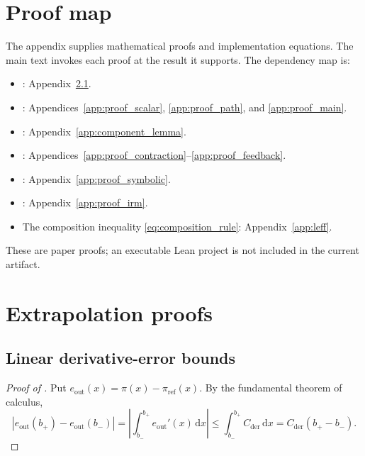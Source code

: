 \appendix

\section{Proof map}
\label{app:lean_overview}

The appendix supplies mathematical proofs and implementation equations. The main text invokes each proof at the result it supports. The dependency map is:
\begin{itemize}
\item {}: Appendix~\ref{app:proof_linear}.
\item {}: Appendices~\ref{app:proof_scalar}, \ref{app:proof_path}, and \ref{app:proof_main}.
\item {}: Appendix~\ref{app:component_lemma}.
\item {}: Appendices~\ref{app:proof_contraction}--\ref{app:proof_feedback}.
\item {}: Appendix~\ref{app:proof_symbolic}.
\item {}: Appendix~\ref{app:proof_irm}.
\item The composition inequality \eqref{eq:composition_rule}: Appendix~\ref{app:leff}.
\end{itemize}
These are paper proofs; an executable Lean project is not included in the current artifact.

\section{Extrapolation proofs}

\subsection{Linear derivative-error bounds}
\label{app:proof_linear}

\begin{proof}[Proof of ]
Put \(e_{\mathrm{out}}(x)=\pi(x)-\pi_{\mathrm{ref}}(x)\). By the fundamental theorem of calculus,
\[
|e_{\mathrm{out}}(b_+)-e_{\mathrm{out}}(b_-)|=\left|\int_{b_-}^{b_+}e_{\mathrm{out}}'(x)\,\mathrm d x\right|
\leq\int_{b_-}^{b_+}C_{\mathrm{der}}\,\mathrm d x
=C_{\mathrm{der}}(b_+-b_-).
\]
\end{proof}

